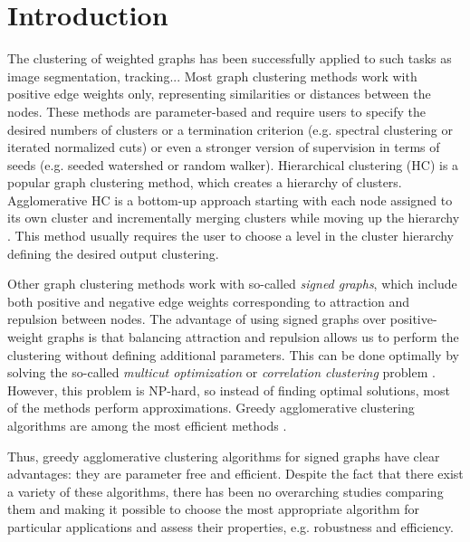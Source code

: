 
\section{Introduction}
The clustering of weighted graphs has been successfully applied to such tasks as image segmentation, tracking... 
Most graph clustering methods work with positive edge weights only, representing similarities or distances between the nodes. These methods are parameter-based and require users to specify the desired numbers of clusters or a termination criterion (e.g. spectral clustering or iterated normalized cuts) or even a stronger version of supervision in terms of seeds (e.g. seeded watershed or random walker).  
Hierarchical clustering (HC) is a popular graph clustering method, which creates a hierarchy of clusters. Agglomerative HC is a bottom-up approach starting with each node assigned to its own cluster and incrementally merging clusters while moving up the hierarchy \cite{lance1967general}. This method usually requires the user to choose a level in the cluster hierarchy defining the desired output clustering. 

Other graph clustering methods work with so-called \emph{signed graphs}, which include both positive and negative edge weights corresponding to attraction and repulsion between nodes. The advantage of using signed graphs over positive-weight graphs is that balancing attraction and repulsion allows us to perform the clustering without defining additional parameters. This can be done optimally by solving the so-called \emph{multicut optimization} or \emph{correlation clustering} problem \cite{kappes2011globally,chopra1991multiway}. However, this problem is NP-hard, so instead of finding optimal solutions, most of the methods perform approximations. Greedy agglomerative clustering algorithms are among the most efficient methods \cite{keuper2015efficient,levinkov2017comparative,wolf2018mutex,kardoostsolving}. 

Thus, greedy agglomerative clustering algorithms for signed graphs have clear advantages: they are parameter free and efficient. Despite the fact that there exist a variety of these algorithms, there has been no overarching studies comparing them and making it possible to choose the most appropriate algorithm for particular applications and assess their properties, e.g. robustness and efficiency.


